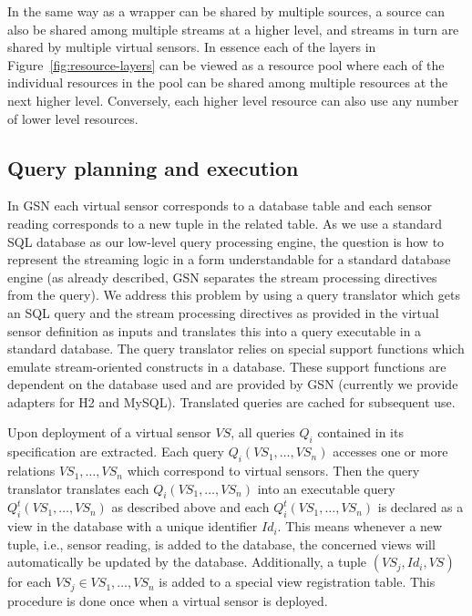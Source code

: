 In the same way as a wrapper can be shared by multiple sources, a source
can also be shared among multiple streams at a higher level, and
streams in turn are shared by multiple virtual sensors. In essence each
of the layers in Figure~\ref{fig:resource-layers} can be viewed as a resource
pool where each of the individual resources in the pool can be shared among
multiple resources at the next higher level. Conversely, each higher level
resource can also use any number of lower level resources.

\subsection{Query planning and execution}
\label{sec:query-proc-optim}

In GSN each virtual sensor corresponds to a database table and each sensor
reading corresponds to a new tuple in the related table. As we use a standard
SQL database as our low-level query processing engine, the question is how to
represent the streaming logic in a form understandable for a standard database
engine (as already described, GSN separates the stream processing directives
from the query). We address this problem by using a query translator which gets
an SQL query and the stream processing directives as provided in the virtual
sensor definition as inputs and translates this into a query executable in a
standard database. The query translator relies on special support functions
which emulate stream-oriented constructs in a database. These support functions
are dependent on the database used and are provided by GSN (currently we
provide adapters for H2 and MySQL). Translated queries are cached for subsequent use.

Upon deployment of a virtual sensor $VS$, all queries $Q_i$ contained in its
specification are extracted. Each query $Q_i(VS_1,\dots,VS_n)$ accesses one or
more relations $VS_1,\dots,VS_n$ which correspond to virtual sensors. Then the
query translator translates each $Q_i(VS_1,\dots,VS_n)$ into an executable
query $Q^t_i(VS_1,\dots,VS_n)$ as described above and each
$Q^t_i(VS_1,\dots,VS_n)$ is declared as a view in the database with a unique
identifier $Id_i$. This means whenever a new tuple, i.e., sensor reading, is
added to the database, the concerned views will automatically be updated by the
database. Additionally, a tuple $(VS_j, Id_i, VS)$ for each $VS_j \in
{VS_1,\dots,VS_n}$ is added to a special view registration table. This
procedure is done once when a virtual sensor is deployed.

